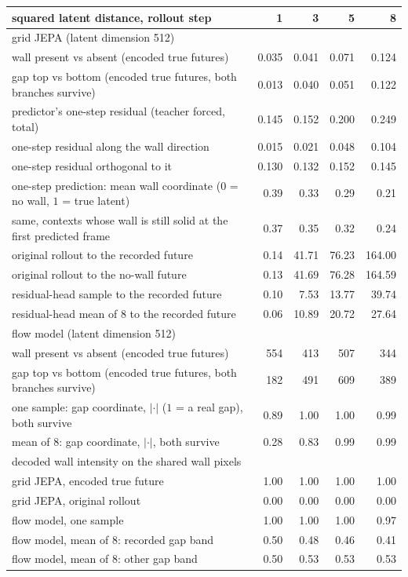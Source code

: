 \begin{tabular}{lrrrr}
\toprule
squared latent distance, rollout step & 1 & 3 & 5 & 8 \\
\midrule
\multicolumn{5}{l}{grid JEPA (latent dimension 512)} \\
wall present vs absent (encoded true futures) & 0.035 & 0.041 & 0.071 & 0.124 \\
gap top vs bottom (encoded true futures, both branches survive) & 0.013 & 0.040 & 0.051 & 0.122 \\
predictor's one-step residual (teacher forced, total) & 0.145 & 0.152 & 0.200 & 0.249 \\
one-step residual along the wall direction & 0.015 & 0.021 & 0.048 & 0.104 \\
one-step residual orthogonal to it & 0.130 & 0.132 & 0.152 & 0.145 \\
one-step prediction: mean wall coordinate ($0$ = no wall, $1$ = true latent) & 0.39 & 0.33 & 0.29 & 0.21 \\
same, contexts whose wall is still solid at the first predicted frame & 0.37 & 0.35 & 0.32 & 0.24 \\
original rollout to the recorded future & 0.14 & 41.71 & 76.23 & 164.00 \\
original rollout to the no-wall future & 0.13 & 41.69 & 76.28 & 164.59 \\
residual-head sample to the recorded future & 0.10 & 7.53 & 13.77 & 39.74 \\
residual-head mean of 8 to the recorded future & 0.06 & 10.89 & 20.72 & 27.64 \\
\midrule
\multicolumn{5}{l}{flow model (latent dimension 512)} \\
wall present vs absent (encoded true futures) & 554 & 413 & 507 & 344 \\
gap top vs bottom (encoded true futures, both branches survive) & 182 & 491 & 609 & 389 \\
one sample: gap coordinate, $|\cdot|$ ($1$ = a real gap), both survive & 0.89 & 1.00 & 1.00 & 0.99 \\
mean of 8: gap coordinate, $|\cdot|$, both survive & 0.28 & 0.83 & 0.99 & 0.99 \\
\midrule
\multicolumn{5}{l}{decoded wall intensity on the shared wall pixels} \\
grid JEPA, encoded true future & 1.00 & 1.00 & 1.00 & 1.00 \\
grid JEPA, original rollout & 0.00 & 0.00 & 0.00 & 0.00 \\
flow model, one sample & 1.00 & 1.00 & 1.00 & 0.97 \\
flow model, mean of 8: recorded gap band & 0.50 & 0.48 & 0.46 & 0.41 \\
flow model, mean of 8: other gap band & 0.50 & 0.53 & 0.53 & 0.53 \\
\bottomrule
\end{tabular}
